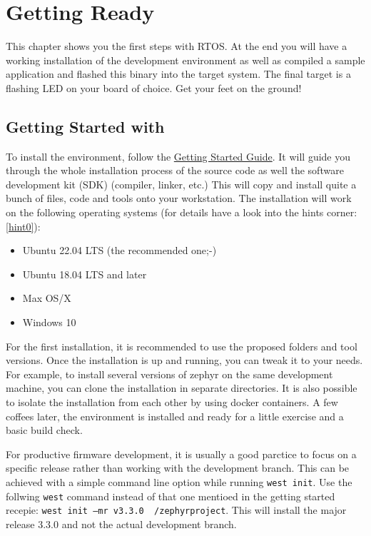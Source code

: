 
\chapter{Getting Ready}

This chapter shows you the first steps with \Zephyr RTOS. At the end you will have a working installation of the development environment as well as compiled a sample application and flashed this binary into the target system. The final target is a flashing LED on your board of choice. Get your feet on the ground!

\section{Getting Started with \Zephyr}


To install the \Zephyr environment, follow the \href{https://docs.zephyrproject.org/latest/getting_started/index.html}{Getting Started Guide}. It will guide you through the whole installation process of the \Zephyr source code as well the software development kit (SDK) (compiler, linker, etc.)
This will copy and install quite a bunch of files, code and tools onto your workstation. The installation will work on the following operating systems (for details have a look into the hints corner: \ref{hint0}):
\begin{itemize}
    \item Ubuntu 22.04 LTS (the recommended one;-)
    \item Ubuntu 18.04 LTS and later
    \item Max OS/X
    \item Windows 10
\end{itemize}

For the first installation, it is recommended to use the proposed folders and tool versions. Once the installation is up and running, you can tweak it to your needs. 
For example, to install several versions of zephyr on the same development machine, you can clone the installation in separate directories. 
It is also possible to isolate the installation from each other by using docker containers. 
% 
% 
A few coffees later, the environment is installed and ready for a little exercise and a basic build check. 

For productive firmware development, it is usually a good parctice to focus on a specific release rather than working with the development branch. This can be achieved with a simple command line option while running \texttt{west init}. Use the follwing \texttt{west} command instead of that one mentioed in the getting started recepie: 
\texttt{west init --mr v3.3.0 ~/zephyrproject}. This will install the \Zephyr major release 3.3.0 and not the actual development branch. 


